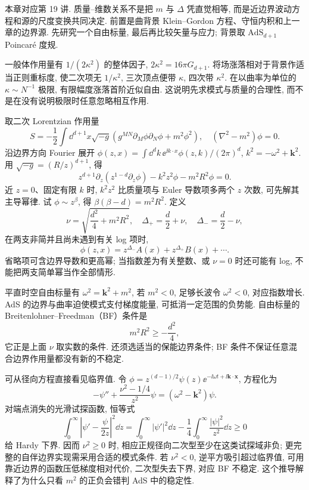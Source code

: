 本章对应第 19 讲. 质量--维数关系不是把 $m$ 与 $\Delta$ 凭直觉相等, 而是近边界波动方程和源的尺度变换共同决定. 前置是曲背景 Klein--Gordon 方程、守恒内积和上一章的边界源. 先研究一个自由标量, 最后再比较矢量与应力; 背景取 $\mathrm{AdS}_{d+1}$ Poincaré 度规.

一般体作用量有 $1/(2\kappa^2)$ 的整体因子, $2\kappa^2=16\pi G_{d+1}$. 将场涨落相对于背景作适当正则重标度, 使二次项无 $1/\kappa^2$, 三次顶点便带 $\kappa$, 四次带 $\kappa^2$. 在以曲率为单位的 $\kappa\sim N^{-1}$ 极限, 有限幅度涨落首阶近似自由. 这说明先求模式与质量的合理性, 而不是在没有说明极限时任意忽略相互作用.

取二次 Lorentzian 作用量
\[
S=-\frac12\int\dd^{d+1}x\sqrt{-g}
(g^{MN}\partial_M\phi\partial_N\phi+m^2\phi^2),
\quad (\nabla^2-m^2)\phi=0.
\]
沿边界方向 Fourier 展开 $\phi(z,x)=\int\dd^dk\,\ee^{\ii k\cdot x}\phi(z,k)/(2\pi)^d$, $k^2=-\omega^2+\mathbf k^2$. 用 $\sqrt{-g}=(R/z)^{d+1}$, 得
\[
z^{d+1}\partial_z(z^{1-d}\partial_z\phi)
-k^2z^2\phi-m^2R^2\phi=0.
\]
近 $z=0$、固定有限 $k$ 时, $k^2z^2$ 比质量项与 Euler 导数项多两个 $z$ 次数, 可先解其主导幂律. 试 $\phi\sim z^\beta$, 得 $\beta(\beta-d)=m^2R^2$. 定义
\[
\nu=\sqrt{\frac{d^2}4+m^2R^2},\quad
\Delta_+=\frac d2+\nu,\quad \Delta_- =\frac d2-\nu,
\]
在两支非简并且尚未遇到有关 log 项时,
\[
\phi(z,x)=z^{\Delta_-}A(x)+z^{\Delta_+}B(x)+\cdots.
\]
省略项可含边界导数和更高幂; 当指数差为有关整数、或 $\nu=0$ 时还可能有 log, 不能把两支简单幂当作全部情形.

平直时空自由标量有 $\omega^2=\mathbf k^2+m^2$, 若 $m^2<0$, 足够长波令 $\omega^2<0$, 对应指数增长. AdS 的边界与曲率迫使模式支付梯度能量, 可抵消一定范围的负势能. 自由标量的 Breitenlohner--Freedman（BF）条件是
\[
m^2R^2\ge-\frac{d^2}4,
\]
它正是上面 $\nu$ 取实数的条件. 还须选适当的保能边界条件; BF 条件不保证任意混合边界作用量都没有新的不稳定.

可从径向方程直接看见临界值. 令 $\phi=z^{(d-1)/2}\psi(z)\ee^{-\ii\omega t+\ii\mathbf k\cdot\mathbf x}$, 方程化为
\[
-\psi''+\frac{\nu^2-1/4}{z^2}\psi
=(\omega^2-\mathbf k^2)\psi.
\]
对端点消失的光滑试探函数, 恒等式
\[
\int_0^\infty\left|\psi'-\frac\psi{2z}\right|^2\dd z
=\int_0^\infty|\psi'|^2\dd z
-\frac14\int_0^\infty\frac{|\psi|^2}{z^2}\dd z\ge0
\]
给 Hardy 下界. 因而 $\nu^2\ge0$ 时, 相应正规径向二次型至少在这类试探域非负; 更完整的自伴边界实现需采用合适的模式条件. 若 $\nu^2<0$, 逆平方吸引超过临界值, 可用靠近边界的函数压低梯度相对代价, 二次型失去下界, 对应 BF 不稳定. 这个推导解释了为什么只看 $m^2$ 的正负会错判 AdS 中的稳定性.


